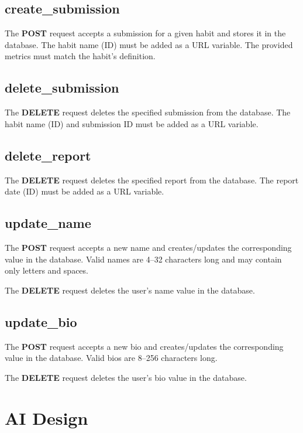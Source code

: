 \documentclass{article}
\newcommand{\newpar}[0]{\vspace{2mm}\noindent}
\begin{document}
\subsection{create\_submission}

The \textbf{POST} request accepts a submission for a given habit and stores it in the database.
The habit name (ID) must be added as a URL variable.
The provided metrics must match the habit's definition.

\subsection{delete\_submission}

The \textbf{DELETE} request deletes the specified submission from the database.
The habit name (ID) and submission ID must be added as a URL variable.

\subsection{delete\_report}

The \textbf{DELETE} request deletes the specified report from the database.
The report date (ID) must be added as a URL variable.

\subsection{update\_name}

The \textbf{POST} request accepts a new name and creates/updates the corresponding value in the database.
Valid names are 4–32 characters long and may contain only letters and spaces.

\newpar
The \textbf{DELETE} request deletes the user's name value in the database.

\subsection{update\_bio}

The \textbf{POST} request accepts a new bio and creates/updates the corresponding value in the database.
Valid bios are 8–256 characters long.

\newpar
The \textbf{DELETE} request deletes the user's bio value in the database.

\section{AI Design}
\end{document}
